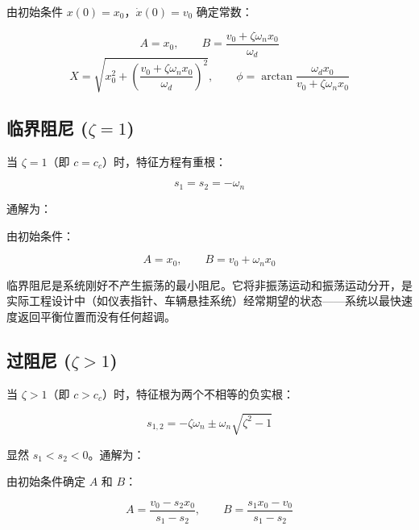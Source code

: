 由初始条件 $x(0) = x_0$，$\dot{x}(0) = v_0$ 确定常数：
\begin{myformula}
    \[
    A = x_0,\qquad B = \frac{v_0 + \zeta\omega_n x_0}{\omega_d}
    \]
    \[
    X = \sqrt{x_0^2 + \left(\frac{v_0 + \zeta\omega_n x_0}{\omega_d}\right)^2},\qquad
    \phi = \arctan\frac{\omega_d x_0}{v_0 + \zeta\omega_n x_0}
    \]
\end{myformula}

\subsection{临界阻尼 ($\zeta = 1$)}

当 $\zeta = 1$（即 $c = c_c$）时，特征方程有重根：
\begin{myformula}
    \[
    s_1 = s_2 = -\omega_n
    \]
\end{myformula}

通解为：
\begin{myformula}
    \end{myformula}

由初始条件：
\begin{myformula}
    \[
    A = x_0,\qquad B = v_0 + \omega_n x_0
    \]
\end{myformula}

临界阻尼是系统刚好不产生振荡的最小阻尼。它将非振荡运动和振荡运动分开，是实际工程设计中（如仪表指针、车辆悬挂系统）经常期望的状态——系统以最快速度返回平衡位置而没有任何超调。

\subsection{过阻尼 ($\zeta > 1$)}

当 $\zeta > 1$（即 $c > c_c$）时，特征根为两个不相等的负实根：
\begin{myformula}
    \[
    s_{1,2} = -\zeta\omega_n \pm \omega_n\sqrt{\zeta^2 - 1}
    \]
\end{myformula}

显然 $s_1 < s_2 < 0$。通解为：
\begin{myformula}
    \end{myformula}

由初始条件确定 $A$ 和 $B$：
\begin{myformula}
    \[
    A = \frac{v_0 - s_2 x_0}{s_1 - s_2},\qquad B = \frac{s_1 x_0 - v_0}{s_1 - s_2}
    \]
\end{myformula}

